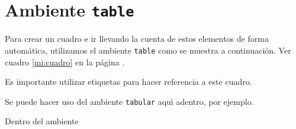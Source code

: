 %
%

\section{Ambiente \texttt{table}}

Para crear un cuadro e ir llevando la cuenta de estos elementos de
forma autom\'atica, utilizamos el ambiente \texttt{table} como se
muestra a continuaci\'on. Ver cuadro \ref{mi:cuadro} en la p\'agina
\pageref{mi:cuadro}.

\begin{table}
  \begin{center}

    Es importante utilizar etiquetas para hacer referencia a este
    cuadro.

    Se puede hacer uso del ambiente \texttt{tabular} aqu\'{\i}
    adentro, por ejemplo.

    \caption{Dentro del ambiente}\label{mi:cuadro}

  \end{center}
\end{table}
